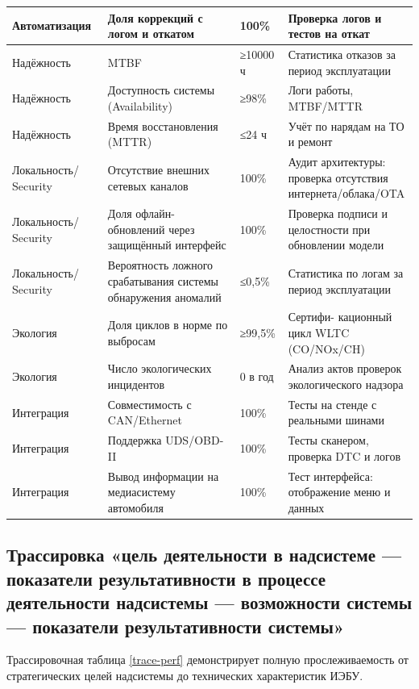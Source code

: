 \documentclass[14pt, a4paper]{extarticle}
\begin{document}
\begin{xltabular}{\textwidth}{|L|L|L|L|}
					\hline
					Автоматизация & Доля коррекций с логом и откатом & 100\% & Проверка логов и тестов на откат \\
					\hline
					Надёжность & MTBF &	≥10000 ч & Статистика отказов за период эксплуатации \\
					\hline
					Надёжность & Доступность системы (Availability) & ≥98\% & Логи работы, MTBF/MTTR \\
					\hline
					Надёжность & Время восстановления (MTTR) & ≤24 ч & Учёт по нарядам на ТО и ремонт \\
					\hline
					Локальность/ Security & Отсутствие внешних сетевых каналов &	100\% & Аудит архитектуры: проверка отсутствия интернета/облака/OTA \\
					\hline
					Локальность/ Security & Доля офлайн-обновлений через защищённый интерфейс & 100\% & Проверка подписи и целостности при обновлении модели \\
					\hline
					Локальность/ Security & Вероятность ложного срабатывания системы обнаружения аномалий & ≤0,5\% & Статистика по логам за период эксплуатации \\
					\hline
					Экология & Доля циклов в норме по выбросам & ≥99,5\% & Сертифи- кационный цикл WLTC (CO/NOx/CH) \\
					\hline
					Экология & Число экологических инцидентов & 0 в год & Анализ актов проверок экологического надзора \\
					\hline
					Интеграция & Совместимость с CAN/Ethernet & 100\% & Тесты на стенде с реальными шинами \\
					\hline
					Интеграция & Поддержка UDS/OBD-II & 100\% & Тесты сканером, проверка DTC и логов \\
					\hline
					Интеграция & Вывод информации на медиасистему автомобиля & 100\% & Тест интерфейса: отображение меню и данных \\
					\hline
				\end{xltabular}
				
				
			\subsection{Трассировка «цель деятельности в надсистеме — показатели результативности в процессе деятельности надсистемы — возможности системы — показатели результативности системы»}
			
			Трассировочная таблица \ref{trace-perf} демонстрирует полную прослеживаемость от стратегических целей надсистемы до технических характеристик ИЭБУ.
			
\end{document}
